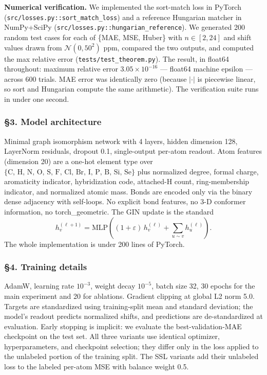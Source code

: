 \documentclass[
]{article}
\begin{document}
\textbf{Numerical verification.} We implemented the sort-match loss in
PyTorch (\texttt{src/losses.py::sort\_match\_loss}) and a reference
Hungarian matcher in NumPy+SciPy
(\texttt{src/losses.py::hungarian\_reference}). We generated 200 random
test cases for each of \{MAE, MSE, Huber\} with \(n\in[2,24]\) and shift
values drawn from \(\mathcal{N}(0,50^2)\) ppm, compared the two outputs,
and computed the max relative error (\texttt{tests/test\_theorem.py}).
The result, in float64 throughout: maximum relative error
\(3.05\times 10^{-16}\) --- float64 machine epsilon --- across 600
trials. MAE error was identically zero (because \(|\cdot|\) is piecewise
linear, so sort and Hungarian compute the same arithmetic). The
verification suite runs in under one second.

\subsubsection{§3. Model architecture}\label{model-architecture}

Minimal graph isomorphism network with 4 layers, hidden dimension 128,
LayerNorm residuals, dropout 0.1, single-output per-atom readout. Atom
features (dimension 20) are a one-hot element type over
\(\{\text{C, H, N, O, S, F, Cl, Br, I, P, B, Si, Se}\}\) plus normalized
degree, formal charge, aromaticity indicator, hybridization code,
attached-H count, ring-membership indicator, and normalized atomic mass.
Bonds are encoded only via the binary dense adjacency with self-loops.
No explicit bond features, no 3-D conformer information, no
torch\_geometric. The GIN update is the standard
\[h_v^{(\ell+1)}=\text{MLP}\!\left((1+\varepsilon)\,h_v^{(\ell)}+\sum_{u\sim v}h_u^{(\ell)}\right).\]
The whole implementation is under 200 lines of PyTorch.

\subsubsection{§4. Training details}\label{training-details}

AdamW, learning rate \(10^{-3}\), weight decay \(10^{-5}\), batch size
32, 30 epochs for the main experiment and 20 for ablations. Gradient
clipping at global L2 norm 5.0. Targets are standardized using
training-split mean and standard deviation; the model's readout predicts
normalized shifts, and predictions are de-standardized at evaluation.
Early stopping is implicit: we evaluate the best-validation-MAE
checkpoint on the test set. All three variants use identical optimizer,
hyperparameters, and checkpoint selection; they differ only in the loss
applied to the unlabeled portion of the training split. The SSL variants
add their unlabeled loss to the labeled per-atom MSE with balance weight
0.5.
\end{document}
